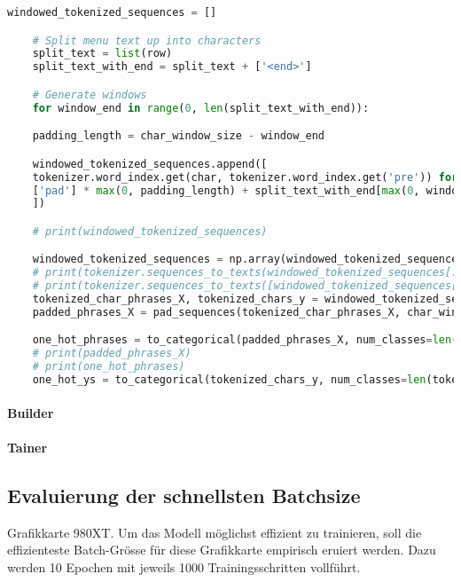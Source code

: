 \begin{lstlisting}[language=Python, caption=Encoding, label=lst:one-hot-encoding]
    windowed_tokenized_sequences = []

    # Split menu text up into characters
    split_text = list(row)
    split_text_with_end = split_text + ['<end>']

    # Generate windows
    for window_end in range(0, len(split_text_with_end)):

    padding_length = char_window_size - window_end

    windowed_tokenized_sequences.append([
    tokenizer.word_index.get(char, tokenizer.word_index.get('pre')) for char in (
    ['pad'] * max(0, padding_length) + split_text_with_end[max(0, window_end-char_window_size):window_end + 1])
    ])

    # print(windowed_tokenized_sequences)

    windowed_tokenized_sequences = np.array(windowed_tokenized_sequences)
    # print(tokenizer.sequences_to_texts(windowed_tokenized_sequences[:, :-1]))
    # print(tokenizer.sequences_to_texts([windowed_tokenized_sequences[:, -1]]))
    tokenized_char_phrases_X, tokenized_chars_y = windowed_tokenized_sequences[:, :-1], windowed_tokenized_sequences[:, -1]
    padded_phrases_X = pad_sequences(tokenized_char_phrases_X, char_window_size)

    one_hot_phrases = to_categorical(padded_phrases_X, num_classes=len(tokenizer.index_word) + 1)
    # print(padded_phrases_X)
    # print(one_hot_phrases)
    one_hot_ys = to_categorical(tokenized_chars_y, num_classes=len(tokenizer.index_word) + 1)
\end{lstlisting}


\paragraph{Builder}

\paragraph{Tainer}

\subsection{Evaluierung der schnellsten Batchsize}
\label{sec:evaluating-fastest-batchsize}
Grafikkarte 980XT.
Um das Modell möglichst effizient zu trainieren, soll die effizienteste Batch-Grösse für diese Grafikkarte empirisch eruiert werden.
Dazu werden 10 Epochen mit jeweils 1000 Trainingsschritten vollführt.

